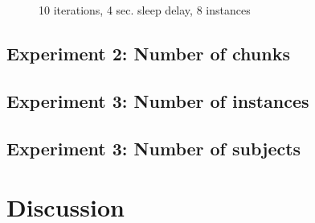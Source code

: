 \documentclass[11pt,a4paper]{article}
\begin{document}
\begin{figure}[p]
    \centering
    
    \caption{10 iterations, 4 sec. sleep delay, 8 instances}
    \label{fig:histo_splits}
\end{figure}

\subsection{Experiment 2: Number of chunks}

\subsection{Experiment 3: Number of instances}

\subsection{Experiment 3: Number of subjects}



\section{Discussion}
\end{document}

